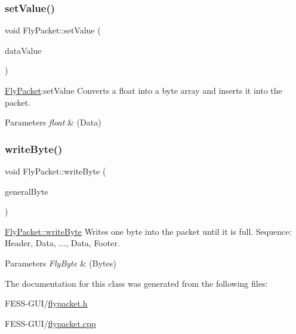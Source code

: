 \subsubsection{\texorpdfstring{set\+Value()}{setValue()}\hspace{0.1cm}{\footnotesize\ttfamily [2/2]}}
{\footnotesize\ttfamily void Fly\+Packet\+::set\+Value (\begin{DoxyParamCaption}\item[{float}]{data\+Value }\end{DoxyParamCaption})}



\hyperlink{class_fly_packet}{Fly\+Packet}\+:set\+Value Converts a float into a byte array and inserts it into the packet. 


\begin{DoxyParams}{Parameters}
{\em float} & (Data) \\
\hline
\end{DoxyParams}
\hypertarget{class_fly_packet_ad0296d3260b26f33eb384dbf5421277a}{}\label{class_fly_packet_ad0296d3260b26f33eb384dbf5421277a} 
\subsubsection{\texorpdfstring{write\+Byte()}{writeByte()}}
{\footnotesize\ttfamily void Fly\+Packet\+::write\+Byte (\begin{DoxyParamCaption}\item[{\hyperlink{conversions_8h_a1f006e31a957accfe6aa1bf6f401efce}{Fly\+Byte}}]{general\+Byte }\end{DoxyParamCaption})}



\hyperlink{class_fly_packet_ad0296d3260b26f33eb384dbf5421277a}{Fly\+Packet\+::write\+Byte} Writes one byte into the packet until it is full. Sequence\+: Header, Data, ..., Data, Footer. 


\begin{DoxyParams}{Parameters}
{\em Fly\+Byte} & (Bytes) \\
\hline
\end{DoxyParams}


The documentation for this class was generated from the following files\+:\begin{DoxyCompactItemize}
\item 
F\+E\+S\+S-\/\+G\+U\+I/\hyperlink{flypacket_8h}{flypacket.\+h}\item 
F\+E\+S\+S-\/\+G\+U\+I/\hyperlink{flypacket_8cpp}{flypacket.\+cpp}\end{DoxyCompactItemize}
